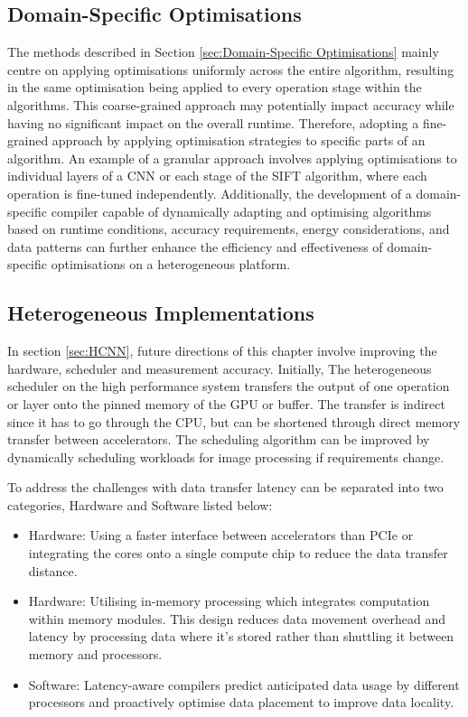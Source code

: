 \subsection{Domain-Specific Optimisations}
The methods described in Section \ref{sec:Domain-Specific Optimisations} mainly centre on applying optimisations uniformly across the entire algorithm, resulting in the same optimisation being applied to every operation stage within the algorithms. This coarse-grained approach may potentially impact accuracy while having no significant impact on the overall runtime. Therefore, adopting a fine-grained approach by applying optimisation strategies to specific parts of an algorithm. An example of a granular approach involves applying optimisations to individual layers of a CNN or each stage of the SIFT algorithm, where each operation is fine-tuned independently. Additionally, the development of a domain-specific compiler capable of dynamically adapting and optimising algorithms based on runtime conditions, accuracy requirements, energy considerations, and data patterns can further enhance the efficiency and effectiveness of domain-specific optimisations on a heterogeneous platform.

\subsection{Heterogeneous Implementations}
In section \ref{sec:HCNN}, future directions of this chapter involve improving the hardware, scheduler and measurement accuracy. Initially, The heterogeneous scheduler on the high performance system transfers the output of one operation or layer onto the pinned memory of the GPU or buffer. The transfer is indirect since it has to go through the CPU, but can be shortened through direct memory transfer between accelerators. The scheduling algorithm can be improved by dynamically scheduling workloads for image processing if requirements change. 

To address the challenges with data transfer latency can be separated into two categories, Hardware and Software listed below:
\begin{itemize}
    \item Hardware: Using a faster interface between accelerators than PCIe or integrating the cores onto a single compute chip to reduce the data transfer distance. 
    \item Hardware: Utilising in-memory processing which integrates computation within memory modules. This design reduces data movement overhead and latency by processing data where it's stored rather than shuttling it between memory and processors. 
    \item Software: Latency-aware compilers predict anticipated data usage by different processors and proactively optimise data placement to improve data locality.
\end{itemize} 


